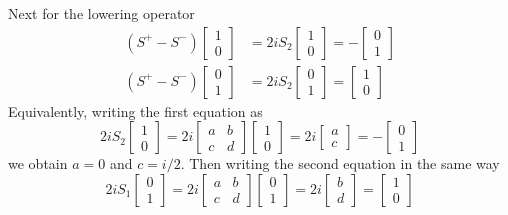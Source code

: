 \documentclass[../../../main.tex]{subfiles}
\begin{document}
Next for the lowering operator
\begin{align*}
(S^+ - S^-) \begin{bmatrix}1 \\ 0 \end{bmatrix} & =  2i S_2 \begin{bmatrix}1 \\ 0 \end{bmatrix} = - \begin{bmatrix}0 \\ 1 \end{bmatrix} \\
(S^+ - S^-) \begin{bmatrix}0 \\ 1 \end{bmatrix} & =  2i S_2 \begin{bmatrix}0 \\ 1 \end{bmatrix} = \begin{bmatrix}1 \\ 0 \end{bmatrix} 
\end{align*}
Equivalently, writing the first equation as
\begin{equation*}
2iS_2 \begin{bmatrix}
1 \\
0 
\end{bmatrix}  = 
2i
\begin{bmatrix}
a & b \\
c & d 
\end{bmatrix}  \begin{bmatrix}
1 \\
0 
\end{bmatrix}  =
2i
\begin{bmatrix}
a \\
c 
\end{bmatrix} 
= 
-
\begin{bmatrix}
0 \\
1 
\end{bmatrix} 
\end{equation*}
we obtain $a=0$ and $c=i/2$.
Then writing the second equation in the same way 
\begin{equation*}
2iS_1 \begin{bmatrix}
0 \\
1 
\end{bmatrix}  = 
2i
\begin{bmatrix}
a & b \\
c & d 
\end{bmatrix}  \begin{bmatrix}
0 \\
1 
\end{bmatrix}  =
2i
\begin{bmatrix}
b \\
d 
\end{bmatrix} 
=
\begin{bmatrix}
1 \\
0 
\end{bmatrix} 
\end{equation*}
\end{document}
